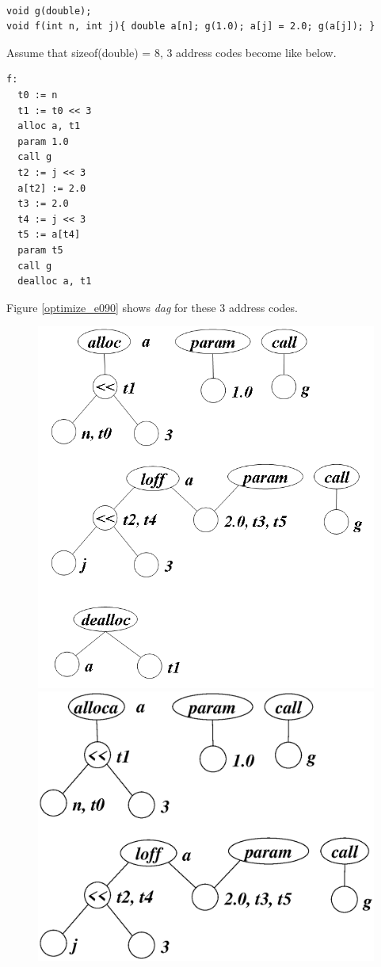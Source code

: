 \begin{Example}
\label{optimize_e089}
\begin{verbatim}

void g(double);
void f(int n, int j){ double a[n]; g(1.0); a[j] = 2.0; g(a[j]); }
\end{verbatim}
Assume that 
sizeof(double) = 8, 3 address codes become like below.
\begin{verbatim}
f:
  t0 := n
  t1 := t0 << 3
  alloc a, t1
  param 1.0
  call g
  t2 := j << 3
  a[t2] := 2.0
  t3 := 2.0
  t4 := j << 3
  t5 := a[t4]
  param t5
  call g
  dealloc a, t1
\end{verbatim}
Figure \ref{optimize_e090} shows {\em dag} for these 3 address codes.
\begin{figure}[htbp]
\begin{center}
\begin{htmlonly}
\includegraphics[width=0.392\linewidth,height=0.5\linewidth]{opt038.png}
\end{htmlonly}
\begin{latexonly}
\includegraphics[width=0.928\linewidth,height=1.0\linewidth]{opt038.eps}

\end{latexonly}
\end{center}
\end{figure}
\end{Example}
